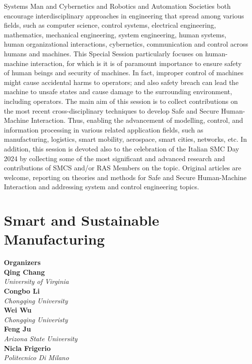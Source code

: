 Systems Man and Cybernetics and Robotics and Automation Societies both encourage interdisciplinary approaches in engineering that spread among various fields, such as computer science, control systems, electrical engineering, mathematics, mechanical engineering, system engineering, human systems, human organizational interactions, cybernetics, communication and control across humans and machines.   This Special Session particularly focuses on human-machine interaction, for which is it is of paramount importance to ensure safety of human beings and security of machines. In fact, improper control of machines might cause accidental harms to operators; and also safety breach can lead the machine to unsafe states and cause damage to the surrounding environment, including operators. The main aim of this session is to collect contributions on the most recent cross-disciplinary techniques to develop Safe and Secure Human-Machine Interaction. Thus, enabling the advancement of modelling, control, and information processing in various related application fields, such as manufacturing, logistics, smart mobility, aerospace, smart cities, networks, etc.  In addition, this session is devoted also to the celebration of the Italian SMC Day 2024 by collecting some of the most significant and advanced research and contributions of SMCS and/or RAS Members on the topic. Original articles are welcome, reporting on theories and methods for Safe and Secure Human-Machine Interaction and addressing system and control engineering topics. 

\section{Smart and Sustainable Manufacturing}


\large \textbf{Organizers} \normalsize \vspace{2mm} \\
\textbf{Qing  Chang} \\ 
\textit{University of Virginia} \vspace{{2mm}} \\
\textbf{Congbo  Li} \\ 
\textit{Chongqing University} \vspace{{2mm}} \\
\textbf{Wei  Wu} \\ 
\textit{Chongqing Univeristy} \vspace{{2mm}} \\
\textbf{Feng  Ju} \\ 
\textit{Arizona State University} \vspace{{2mm}} \\
\textbf{Nicla  Frigerio} \\ 
\textit{Politecnico Di Milano}

